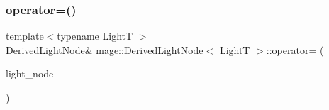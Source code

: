 \hypertarget{classmage_1_1_derived_light_node_a7eabbc97578958f97a7ec11728364eec}{}\label{classmage_1_1_derived_light_node_a7eabbc97578958f97a7ec11728364eec} 
\subsubsection{\texorpdfstring{operator=()}{operator=()}\hspace{0.1cm}{\footnotesize\ttfamily [2/2]}}
{\footnotesize\ttfamily template$<$typename LightT $>$ \\
\hyperlink{classmage_1_1_derived_light_node}{Derived\+Light\+Node}\& \hyperlink{classmage_1_1_derived_light_node}{mage\+::\+Derived\+Light\+Node}$<$ LightT $>$\+::operator= (\begin{DoxyParamCaption}\item[{\hyperlink{classmage_1_1_derived_light_node}{Derived\+Light\+Node}$<$ LightT $>$ \&\&}]{light\+\_\+node }\end{DoxyParamCaption})\hspace{0.3cm}{\ttfamily [delete]}}

